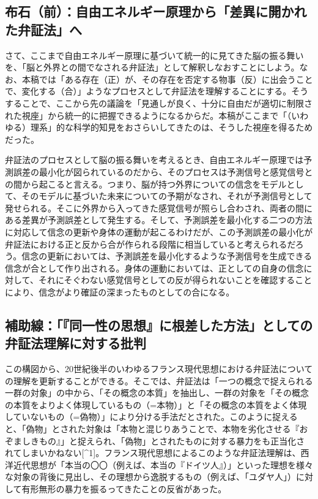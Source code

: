\subsection{布石（前）：自由エネルギー原理から「差異に開かれた弁証法」へ}\label{ux5e03ux77f3ux524dux81eaux7531ux30a8ux30cdux30ebux30aeux30fcux539fux7406ux304bux3089ux5deeux7570ux306bux958bux304bux308cux305fux5f01ux8a3cux6cd5ux3078}

さて、ここまで自由エネルギー原理に基づいて統一的に見てきた脳の振る舞いを、「脳と外界との間でなされる弁証法」として解釈しなおすことにしよう。なお、本稿では「ある存在（正）が、その存在を否定する物事（反）に出会うことで、変化する（合）」ようなプロセスとして弁証法を理解することにする。そうすることで、ここから先の議論を「見通しが良く、十分に自由だが適切に制限された視座」から統一的に把握できるようになるからだ。本稿がここまで「（いわゆる）理系」的な科学的知見をおさらいしてきたのは、そうした視座を得るためだった。

弁証法のプロセスとして脳の振る舞いを考えるとき、自由エネルギー原理では予測誤差の最小化が図られているのだから、そのプロセスは予測信号と感覚信号との間から起こると言える。つまり、脳が持つ外界についての信念をモデルとして、そのモデルに基づいた未来についての予期がなされ、それが予測信号として発せられる。そこに外界から入ってきた感覚信号が照らし合わされ、両者の間にある差異が予測誤差として発生する。そして、予測誤差を最小化する二つの方法に対応して信念の更新や身体の運動が起こるわけだが、この予測誤差の最小化が弁証法における正と反から合が作られる段階に相当していると考えられるだろう。信念の更新においては、予測誤差を最小化するような予測信号を生成できる信念が合として作り出される。身体の運動においては、正としての自身の信念に対して、それにそぐわない感覚信号としての反が得られないことを確認することにより、信念がより確証の深まったものとしての合になる。

\subsection{補助線：「『同一性の思想』に根差した方法」としての弁証法理解に対する批判}\label{ux88dcux52a9ux7ddaux540cux4e00ux6027ux306eux601dux60f3ux306bux6839ux5deeux3057ux305fux65b9ux6cd5ux3068ux3057ux3066ux306eux5f01ux8a3cux6cd5ux7406ux89e3ux306bux5bfeux3059ux308bux6279ux5224}

この構図から、20世紀後半のいわゆるフランス現代思想における弁証法についての理解を更新することができる。そこでは、弁証法は「一つの概念で捉えられる一群の対象」の中から、「その概念の本質」を抽出し、一群の対象を「その概念の本質をよりよく体現しているもの（=本物）」と「その概念の本質をよく体現していないもの（=偽物）」により分ける手法だとされた。このように捉えると、「偽物」とされた対象は「本物と混じりあうことで、本物を劣化させる『おぞましきもの』」と捉えられ、「偽物」とされたものに対する暴力をも正当化されてしまいかねない{[}\^{}1{]}。フランス現代思想によるこのような弁証法理解は、西洋近代思想が「本当の〇〇（例えば、本当の『ドイツ人』）」といった理想を様々な対象の背後に見出し、その理想から逸脱するもの（例えば、「ユダヤ人」）に対して有形無形の暴力を振るってきたことの反省があった。

